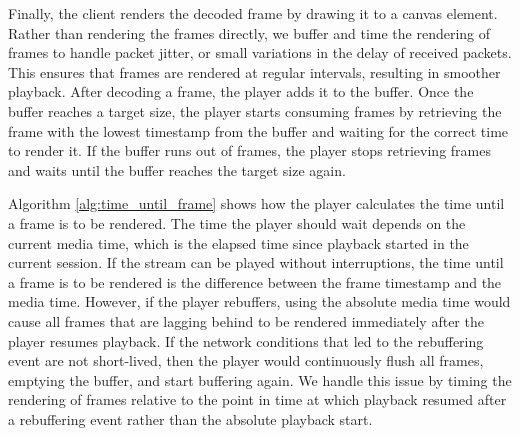 Finally, the client renders the decoded frame by drawing it to a canvas element. Rather than rendering the frames directly, we buffer and time the rendering of frames to handle packet jitter, or small variations in the delay of received packets. This ensures that frames are rendered at regular intervals, resulting in smoother playback. After decoding a frame, the player adds it to the buffer. Once the buffer reaches a target size, the player starts consuming frames by retrieving the frame with the lowest timestamp from the buffer and waiting for the correct time to render it. If the buffer runs out of frames, the player stops retrieving frames and waits until the buffer reaches the target size again.

Algorithm \ref{alg:time_until_frame} shows how the player calculates the time until a frame is to be rendered. The time the player should wait depends on the current media time, which is the elapsed time since playback started in the current session. If the stream can be played without interruptions, the time until a frame is to be rendered is the difference between the frame timestamp and the media time. However, if the player rebuffers, using the absolute media time would cause all frames that are lagging behind to be rendered immediately after the player resumes playback. If the network conditions that led to the rebuffering event are not short-lived, then the player would continuously flush all frames, emptying the buffer, and start buffering again. We handle this issue by timing the rendering of frames relative to the point in time at which playback resumed after a rebuffering event rather than the absolute playback start.  %


